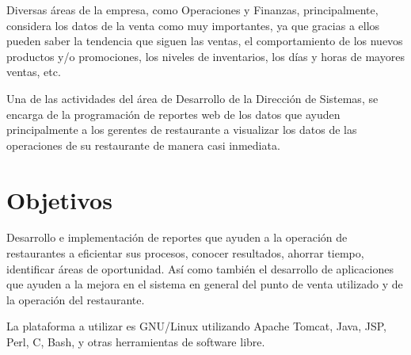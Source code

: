 Diversas áreas de la empresa, como Operaciones y Finanzas, principalmente, considera los datos de la venta como muy importantes, ya que gracias a ellos pueden saber la tendencia que siguen las ventas, el comportamiento de los nuevos productos y/o promociones, los niveles de inventarios, los días y horas de mayores ventas, etc. 

Una de las actividades del área de Desarrollo de la Dirección de Sistemas, se encarga de la programación de reportes web de los datos que ayuden principalmente a los gerentes de restaurante a visualizar los datos de las operaciones de su restaurante de manera casi inmediata.

\section*{Objetivos}
\label{sec:objetivosss}

Desarrollo e implementación de reportes que ayuden a la operación de restaurantes a eficientar sus procesos, conocer resultados, ahorrar tiempo, identificar áreas de oportunidad. Así como también el desarrollo de aplicaciones que ayuden a la mejora en el sistema en general del punto de venta utilizado y de la operación del restaurante.

La plataforma a utilizar es GNU/Linux utilizando Apache Tomcat, Java, JSP, Perl, C, Bash, y otras herramientas de software libre.